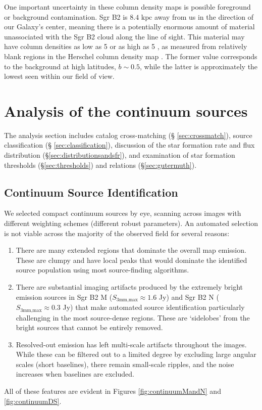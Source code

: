 \documentclass[twocolumn]{aastex61}
\newcommand{\dsgrb}{\ensuremath{8.4\textrm{~kpc}}\xspace}
\begin{document}
One important uncertainty in these column density maps is possible foreground
or background contamination.  Sgr B2 is \dsgrb away from us in the direction of
our Galaxy's center, meaning there is a potentially enormous amount of material
unassociated with the Sgr B2 cloud along the line of sight.  This material may
have column densities as low as 5 \persc or as high as 5 \persc,
as measured from relatively blank regions in the Herschel column density map
\citep[][and in prep]{Battersby2011a}.  The former value corresponds to the
background at high latitudes, $b\sim0.5$, while the latter  is approximately
the lowest seen within our field of view. 

\section{Analysis of the continuum sources}
\label{sec:analysis}
The analysis section includes catalog cross-matching (\S
\ref{sec:crossmatch}), source classification (\S
\ref{sec:classification}), discussion of the star formation rate and flux
distribution (\S \ref{sec:distributionsandsfr}), and examination of star formation
thresholds (\S \ref{sec:thresholds}) and relations (\S \ref{sec:gutermuth}). 

\subsection{Continuum Source Identification}
\label{sec:contsources}
We selected compact continuum  sources by eye,
scanning across images with different weighting schemes (different robust
parameters).  An automated selection is not viable across the majority of the
observed field for several reasons:
\begin{enumerate}
    \item There are many extended \hii regions that dominate the overall map
        emission.  These are clumpy and have local peaks that would dominate
        the identified source population using most source-finding algorithms.
    \item There are substantial imaging artifacts produced by the extremely
        bright emission sources in Sgr B2 M ($S_{3 \textrm{mm,max}} \approx 1.6$ Jy) and
        Sgr B2 N ($S_{3 \textrm{mm,max}} \approx 0.3$ Jy) that make automated source
        identification particularly challenging in the most source-dense
        regions.  These are `sidelobes' from the bright sources that cannot be
        entirely removed.
    \item Resolved-out emission has left multi-scale artifacts throughout the
        images.  While these can be filtered out to a limited degree by
        excluding large angular scales (short baselines), there remain
        small-scale ripples, and the noise increases when baselines are
        excluded.
\end{enumerate}
All of these features are evident in Figures \ref{fig:continuumMandN} and
\ref{fig:continuumDS}. 
\end{document}
